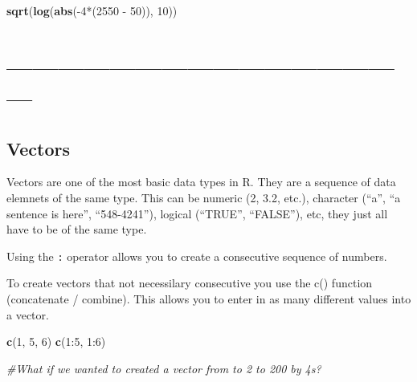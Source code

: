 \documentclass[]{article}
\newenvironment{Shaded}{\begin{snugshade}}{\end{snugshade}}
\newcommand{\KeywordTok}[1]{\textcolor[rgb]{0.13,0.29,0.53}{\textbf{{#1}}}}
\newcommand{\DecValTok}[1]{\textcolor[rgb]{0.00,0.00,0.81}{{#1}}}
\newcommand{\StringTok}[1]{\textcolor[rgb]{0.31,0.60,0.02}{{#1}}}
\newcommand{\CommentTok}[1]{\textcolor[rgb]{0.56,0.35,0.01}{\textit{{#1}}}}
\newcommand{\NormalTok}[1]{{#1}}
\begin{document}
\begin{Shaded}
\begin{Highlighting}[]
\KeywordTok{sqrt}\NormalTok{(}\KeywordTok{log}\NormalTok{(}\KeywordTok{abs}\NormalTok{(-}\DecValTok{4}\NormalTok{*(}\DecValTok{2550} \NormalTok{-}\StringTok{ }\DecValTok{50}\NormalTok{)), }\DecValTok{10}\NormalTok{))}
\end{Highlighting}
\end{Shaded}

\section{------------------------------------------------}\label{section-2}

\subsection{Vectors}\label{vectors}

Vectors are one of the most basic data types in R. They are a sequence
of data elemnets of the same type. This can be numeric (2, 3.2, etc.),
character (``a'', ``a sentence is here'', ``548-4241''), logical
(``TRUE'', ``FALSE''), etc, they just all have to be of the same type.

Using the \texttt{:} operator allows you to create a consecutive
sequence of numbers.

\begin{Shaded}
\end{Shaded}

To create vectors that not necessilary consecutive you use the c()
function (concatenate / combine). This allows you to enter in as many
different values into a vector.

\begin{Shaded}
\begin{Highlighting}[]
\KeywordTok{c}\NormalTok{(}\DecValTok{1}\NormalTok{, }\DecValTok{5}\NormalTok{, }\DecValTok{6}\NormalTok{)}
\KeywordTok{c}\NormalTok{(}\DecValTok{1}\NormalTok{:}\DecValTok{5}\NormalTok{, }\DecValTok{1}\NormalTok{:}\DecValTok{6}\NormalTok{)}

\CommentTok{#What if we wanted to created a vector from to 2 to 200 by 4s?}
\end{Highlighting}
\end{Shaded}
\end{document}
